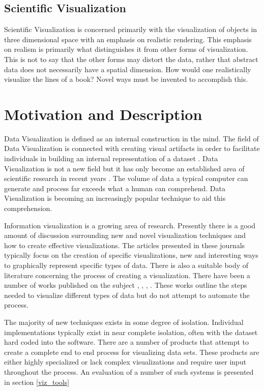 \documentclass[a4paper, 11pt, titlepage, onehalfspacing]{report}
\begin{document}
\subsection{Scientific Visualization}
Scientific Visualization is concerned primarily with the visualization of objects in three dimensional space with an emphasis on realistic rendering. This emphasis on realism is primarily what distinguishes it from other forms of visualization. This is not to say that the other forms may distort the data, rather that abstract data does not necessarily have a spatial dimension. How would one realistically visualize the lines of a book? Novel ways must be invented to accomplish this.

 
\section{Motivation and Description} 

Data Visualization is defined as an internal construction in the mind. The field of Data Visualization is connected with creating visual artifacts in order to facilitate individuals in building an internal representation of a dataset \cite{spence2001information}. Data Visualization is not a new field but it has only become an established area of scientific research in recent years \cite{friendly2001milestones}. The volume of data a typical computer can generate and process far exceeds what a human can comprehend. Data Visualization is becoming an increasingly popular technique to aid this comprehension.

Information visualization is a growing area of research. Presently there is a good amount of discussion surrounding new and novel visualization techniques and how to create effective visualizations. The articles presented in these journals typically focus on the creation of specific visualizations, new and interesting ways to graphically represent specific types of data. There is also a suitable body of literature concerning the  process of creating a visualization. There have been a number of works published on the subject \cite{mazza2009introduction}, \cite{shneiderman1996eyes}, \cite{bertin1973semiologie}, \cite{haskell1919make}. These works outline the steps needed to visualize different types of data but do not attempt to automate the process.

The majority of new techniques exists in some degree of isolation. Individual implementations typically exist in near complete isolation, often with the dataset hard coded into the software.  There are a number of products that attempt to create a complete end to end process for visualizing data sets. These products are either highly specialized or lack complex visualizations and require user input throughout the process. An evaluation of a number of such systems is presented in section \ref{viz_tools}
\end{document}

